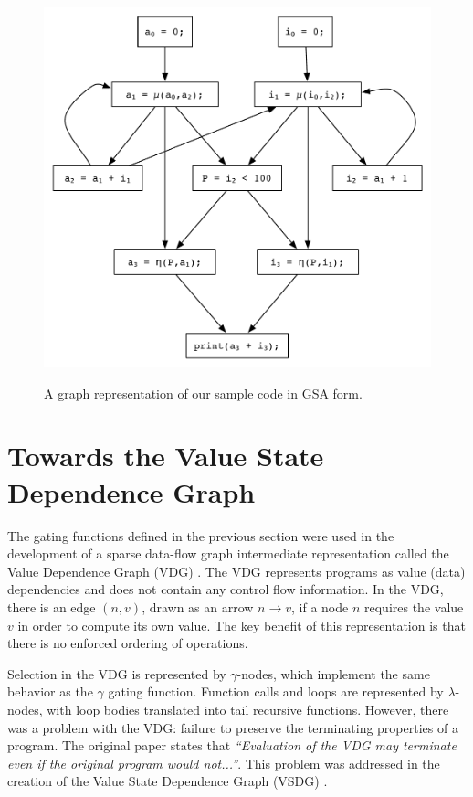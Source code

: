 \begin{figure}
\centering
\includegraphics[scale=0.55]{gsa-example.pdf}
\label{fig: gsa-graph-example}
\caption{A graph representation of our sample code in GSA form.}
\end{figure}


\section{Towards the Value State Dependence Graph}

The gating functions defined in the previous section were used in the development of a sparse data-flow graph intermediate representation called the Value Dependence Graph (VDG) \cite{177907}. The VDG represents programs as value (data) dependencies and does not contain any control flow information. In the VDG, there is an edge $(n,v)$, drawn as an arrow $n\rightarrow v$, if a node $n$ requires the value $v$ in order to compute its own value. The key benefit of this representation is that there is no enforced ordering of operations. 

Selection in the VDG is represented by $\gamma$-nodes, which implement the same behavior as the $\gamma$ gating function. Function calls and loops are represented by $\lambda$-nodes, with loop bodies translated into tail recursive functions. However, there was a problem with the VDG: failure to preserve the terminating properties of a program. The original paper states that \textit{``Evaluation of the VDG may terminate even if the original program would not...''}. This problem was addressed in the creation of the Value State Dependence Graph (VSDG) \cite{UCAM-CL-TR-607}.

